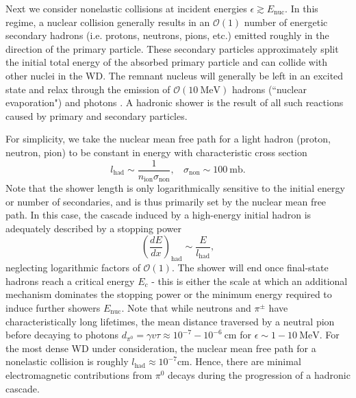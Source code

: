 \documentclass[twocolumn,showpacs,preprintnumbers,amsmath,amssymb,prd]{revtex4}
\newcommand{\OO}{\mathcal{O}}
\def\r{\right)}
\def\l{\left(}
\begin{document}
\begin{appendices}
Next we consider nonelastic collisions at incident energies $\epsilon \gtrsim E_\text{nuc}$.
In this regime, a nuclear collision generally results in an $\OO(1)$ number of energetic secondary hadrons (i.e.
protons, neutrons, pions, etc.) emitted roughly in the direction of the primary particle.
These secondary particles approximately split the initial total energy of the absorbed primary particle and can collide with other nuclei in the WD.
The remnant nucleus will generally be left in an excited state and relax through the emission of $\OO(10 ~\text{MeV})$ hadrons (``nuclear evaporation") and photons \cite{Rossi}.
A hadronic shower is the result of all such reactions caused by primary and secondary particles.

For simplicity, we take the nuclear mean free path for a light hadron (proton, neutron, pion) to be constant in energy with characteristic cross section
\begin{equation}
l_\text{had} \sim  \frac{1}{n_\text{ion} \sigma_\text{non}}, ~~~~ \sigma_\text{non} \sim 100 ~\text{mb}.
\end{equation}
Note that the shower length is only logarithmically sensitive to the initial energy or number of secondaries, and is thus primarily set by the nuclear mean free path.
In this case, the cascade induced by a high-energy initial hadron is adequately described by a stopping power
\begin{equation}
\label{eq:nucshower}
\l \frac{dE}{dx}\r_\text{had} \sim \frac{E}{l_\text{had}},
\end{equation}
neglecting logarithmic factors of $\OO(1)$.
The shower will end once final-state hadrons reach a critical energy $E_c$ - this is either the scale at which an additional mechanism dominates the stopping power or the minimum energy required to induce further showers $E_\text{nuc}$.
Note that while neutrons and $\pi^\pm$ have characteristically long lifetimes, the mean distance traversed by a neutral pion before decaying to photons $d_{\pi^0} = \gamma v \tau \approx 10^{-7} - 10^{-6} ~\text{cm}$ for $\epsilon \sim 1 - 10 ~\text{MeV}$.
For the most dense WD under consideration, the nuclear mean free path for a nonelastic collision is roughly $l_\text{had} \approx 10^{-7} \text{cm}$.
Hence, there are minimal electromagnetic contributions from $\pi^0$ decays during the progression of a hadronic cascade.


\end{appendices}
\end{document}

